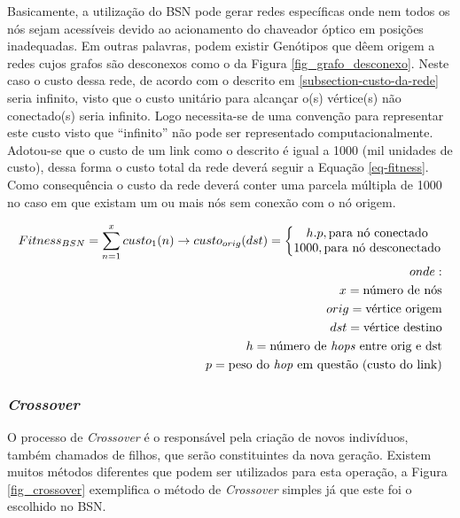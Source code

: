 Basicamente, a utilização do BSN pode gerar redes específicas onde nem todos os nós sejam acessíveis devido ao acionamento do chaveador óptico em posições inadequadas. Em outras palavras, podem existir Genótipos que dêem origem a redes cujos grafos são desconexos como o da Figura \ref{fig_grafo_desconexo}. Neste caso o custo dessa rede, de acordo com o descrito em \ref{subsection-custo-da-rede} seria infinito, visto que o custo unitário para alcançar o(s) vértice(s) não conectado(s) seria infinito. Logo necessita-se de uma convenção para representar este custo visto que ``infinito'' não pode ser representado computacionalmente. Adotou-se que o custo de um link como o descrito é igual a 1000 (mil unidades de custo), dessa forma o custo total da rede deverá seguir a Equação \ref{eq-fitness}. Como consequência o custo da rede deverá conter uma parcela múltipla de 1000 no caso em que existam um ou mais nós sem conexão com o nó origem. 

\setcounter{equation}{0} \renewcommand{\theequation}{\arabic{equation}}
\begin{equation}
\begin{split}
Fitness_{BSN} = \sum_{n=1}^{x}custo_{1}(n) \rightarrow custo_{orig}(dst)=\left\{\begin{matrix}
h.p, \textup{para nó conectado}\\ 1000, \textup{para nó desconectado}
\end{matrix}\right.
\\onde:\\
x=\textup{número de nós}
\\orig=\textup{vértice origem}
\\dst=\textup{vértice destino}
\\h=\textup{número de \emph{hops} entre orig e dst}
\\p=\textup{peso do \emph{hop} em questão (custo do link)}
\end{split}
\label{eq-fitness}
\end{equation}

\subsubsection{\emph{Crossover}}
O processo de \emph{Crossover} é o responsável pela criação de novos indivíduos, também chamados de filhos, que serão constituintes da nova geração. Existem muitos métodos diferentes que podem ser utilizados para esta operação, a Figura \ref{fig_crossover} exemplifica o método de \emph{Crossover} simples já que este foi o escolhido no BSN.

